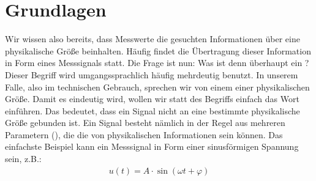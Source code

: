 \documentclass[letterpaper,10pt,english]{jupyterBook}
\begin{document}
\sphinxstepscope


\section{Grundlagen}
\label{\detokenize{content/3_basics:grundlagen}}\label{\detokenize{content/3_basics::doc}}
\sphinxAtStartPar
Wir wissen also bereits, dass Messwerte die gesuchten Informationen über eine physikalische Größe beinhalten. Häufig findet die Übertragung dieser Information in Form eines Messsignals statt. Die Frage ist nun: Was ist denn überhaupt ein ? Dieser Begriff wird umgangssprachlich häufig mehrdeutig benutzt. In unserem Falle, also im technischen Gebrauch, sprechen wir von einem  einer physikalischen Größe. Damit es eindeutig wird, wollen wir statt des Begriffs  einfach das Wort  einführen. Das bedeutet, dass ein Signal nicht an eine bestimmte physikalische Größe gebunden ist. Ein Signal besteht nämlich in der Regel aus mehreren Parametern (), die die  von physikalischen Informationen sein können. Das einfachste Beispiel kann ein Messsignal in Form einer sinusförmigen Spannung sein, z.B.:
\begin{equation*}
\begin{split}u(t) = A \cdot \sin(\omega t + \varphi)\end{split}
\end{equation*}
\end{document}

